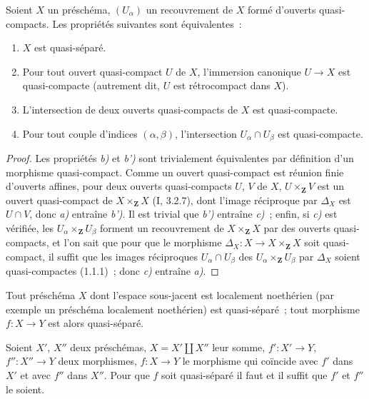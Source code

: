 \begin{proposition}[1.2.7]
\label{IV.1.2.7-fr}
Soient $X$ un préschéma, $(U_\alpha)$ un recouvrement de $X$ formé d'ouverts
quasi-compacts. Les propriétés suivantes sont équivalentes~:
\begin{enumerate}
  \item[a)] $X$ est quasi-séparé.
  \item[b)] Pour tout ouvert quasi-compact $U$ de $X$, l'immersion canonique
  $U\to X$ est quasi-compacte (autrement dit, $U$ est rétrocompact dans $X$).
  \item[b')] L'intersection de deux ouverts quasi-compacts de $X$ est
  quasi-compacte.
  \item[c)] Pour tout couple d'indices $(\alpha,\beta)$, l'intersection
  $U_\alpha\cap U_\beta$ est quasi-compacte.
\end{enumerate}
\end{proposition}

\begin{proof}
Les propriétés \emph{b)} et \emph{b')} sont trivialement équivalentes par
définition d'un morphisme quasi-compact. Comme un ouvert quasi-compact est
réunion finie d'ouverts affines, pour deux ouverts quasi-compacts $U$, $V$ de
$X$, $U\times_{\mathbf Z}V$ est un ouvert quasi-compact de
$X\times_{\mathbf Z}X$ (I, 3.2.7), dont l'image réciproque par $\Delta_X$ est
$U\cap V$, donc \emph{a)} entraîne \emph{b')}. Il est trivial que \emph{b')}
entraîne \emph{c)}~; enfin, si \emph{c)} est vérifiée, les
$U_\alpha\times_{\mathbf Z}U_\beta$ forment un recouvrement de
$X\times_{\mathbf Z}X$ par des ouverts quasi-compacts, et l'on sait que pour
que le morphisme $\Delta_X:X\to X\times_{\mathbf Z}X$ soit quasi-compact, il
suffit que les images réciproques $U_\alpha\cap U_\beta$ des
$U_\alpha\times_{\mathbf Z}U_\beta$ par $\Delta_X$ soient quasi-compactes
(1.1.1)~; donc \emph{c)} entraîne \emph{a)}.
\end{proof}

\begin{corollary}[1.2.8]
\label{IV.1.2.8-fr}
Tout préschéma $X$ dont l'espace sous-jacent est localement noethérien (par
exemple un préschéma localement noethérien) est quasi-séparé~; tout morphisme
$f:X\to Y$ est alors quasi-séparé.
\end{corollary}

\begin{proposition}[1.2.9]
\label{IV.1.2.9-fr}
Soient $X'$, $X''$ deux préschémas, $X=X'\coprod X''$ leur somme,
$f':X'\to Y$, $f'':X''\to Y$ deux morphismes, $f:X\to Y$ le morphisme qui
coïncide avec $f'$ dans $X'$ et avec $f''$ dans $X''$. Pour que $f$ soit
quasi-séparé il faut et il suffit que $f'$ et $f''$ le soient.
\end{proposition}

